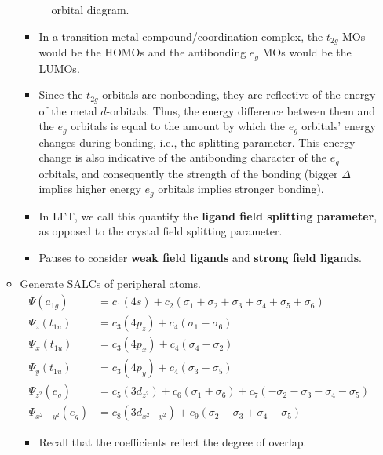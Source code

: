 \documentclass[../notes.tex]{subfiles}
\begin{document}
\begin{itemize}
\begin{itemize}
\begin{figure}[h!]
            \caption{ orbital diagram.}
            \label{fig:orbitalDiagram-MH6}
        \end{figure}
        \begin{itemize}
            \item In a transition metal compound/coordination complex, the $t_{2g}$ MOs would be the HOMOs and the antibonding $e_g$ MOs would be the LUMOs.
            \item Since the $t_{2g}$ orbitals are nonbonding, they are reflective of the energy of the metal $d$-orbitals. Thus, the energy difference between them and the $e_g$ orbitals is equal to the amount by which the $e_g$ orbitals' energy changes during bonding, i.e., the splitting parameter. This energy change is also indicative of the antibonding character of the $e_g$ orbitals, and consequently the strength of the bonding (bigger $\Delta$ implies higher energy $e_g$ orbitals implies stronger bonding).
            \item In LFT, we call this quantity the \textbf{ligand field splitting parameter}, as opposed to the crystal field splitting parameter.
            \item Pauses to consider \textbf{weak field ligands} and \textbf{strong field ligands}.
        \end{itemize}
        \item Generate SALCs of peripheral atoms.
        \begin{align*}
            \Psi(a_{1g}) &= c_1(4s)+c_2(\sigma_1+\sigma_2+\sigma_3+\sigma_4+\sigma_5+\sigma_6)\\
            \Psi_z(t_{1u}) &= c_3(4p_z)+c_4(\sigma_1-\sigma_6)\\
            \Psi_x(t_{1u}) &= c_3(4p_x)+c_4(\sigma_4-\sigma_2)\\
            \Psi_y(t_{1u}) &= c_3(4p_y)+c_4(\sigma_3-\sigma_5)\\
            \Psi_{z^2}(e_g) &= c_5(3d_{z^2})+c_6(\sigma_1+\sigma_6)+c_7(-\sigma_2-\sigma_3-\sigma_4-\sigma_5)\\
            \Psi_{x^2-y^2}(e_g) &= c_8(3d_{x^2-y^2})+c_9(\sigma_2-\sigma_3+\sigma_4-\sigma_5)
        \end{align*}
        \begin{itemize}
            \item Recall that the coefficients reflect the degree of overlap.

\end{itemize}
\end{itemize}
\end{itemize}
\end{document}
